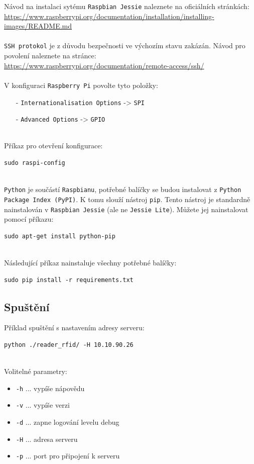 \documentclass[czech,BP]{thesiskiv}
\begin{document}
Návod na instalaci sytému \texttt{Raspbian Jessie} naleznete na oficiálních stránkách: \\ \url{https://www.raspberrypi.org/documentation/installation/installing-images/README.md}
\\\\
\texttt{SSH protokol} je z důvodu bezpečnosti ve výchozím stavu zakázán. Návod pro povolení naleznete na stránce: \\ \url{https://www.raspberrypi.org/documentation/remote-access/ssh/}
\\\\
V konfiguraci \texttt{Raspberry Pi} povolte tyto položky:
\begin{itemize}[noitemsep]
\item [-] \texttt{Internationalisation Options} -> \texttt{SPI}
\item [-] \texttt{Advanced Options} -> \texttt{GPIO}
\end{itemize}
\ \\
Příkaz pro otevření konfigurace:
\begin{verbatim}
sudo raspi-config
\end{verbatim}
\ \\
\texttt{Python} je součástí \texttt{Raspbianu}, potřebné balíčky se budou instalovat z \texttt{Python Package Index (PyPI)}. K tomu slouží nástroj \texttt{pip}. Tento nástroj je standardně nainstalován v \texttt{Raspbian Jessie} (ale ne \texttt{Jessie Lite}). Můžete jej nainstalovat pomocí příkazu: 
\begin{verbatim}
sudo apt-get install python-pip
\end{verbatim}
\ \\
Následující příkaz nainstaluje všechny potřebné balíčky: 
\begin{verbatim}
sudo pip install -r requirements.txt
\end{verbatim}

\subsection{Spuštění}
Příklad spuštění s nastavením adresy serveru:

\begin{verbatim}
python ./reader_rfid/ -H 10.10.90.26
\end{verbatim}
\ \\
Volitelné parametry:
\begin{itemize}[noitemsep]
	\item \texttt{-h} ... vypíše nápovědu
	\item \texttt{-v} ... vypíše verzi
	\item \texttt{-d} ... zapne logování levelu debug
	\item \texttt{-H} ... adresa serveru
	\item \texttt{-p} ... port pro připojení k serveru
\end{itemize}
\end{document}
